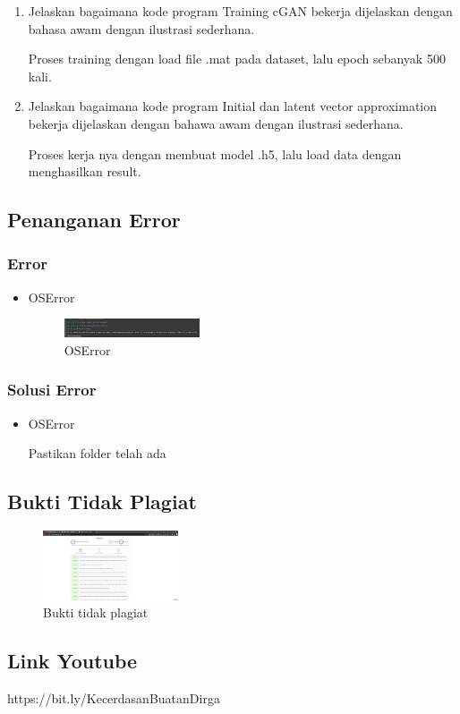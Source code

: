 \begin{enumerate}
	\item Jelaskan bagaimana kode program Training cGAN bekerja dijelaskan dengan bahasa awam dengan ilustrasi sederhana.
	\hfill\break
	
	Proses training dengan load file .mat pada dataset, lalu epoch sebanyak 500 kali.

	\item Jelaskan bagaimana kode program Initial dan latent vector approximation bekerja dijelaskan dengan bahawa awam dengan ilustrasi sederhana.
	\hfill\break
	
	Proses kerja nya dengan membuat model .h5, lalu load data dengan menghasilkan result.
	
\end{enumerate}

\subsection{Penanganan Error}
\subsubsection{Error}
\hfill\break
\begin{itemize}
\item OSError

\begin{figure}[H]
\centering
	\includegraphics[width=4cm]{figures/1174066/8/error1.jpg}
\caption{OSError}
\end{figure}
\end{itemize}
\subsubsection{Solusi Error}
\hfill\break
\begin{itemize}
\item OSError

Pastikan folder telah ada
\end{itemize}

\subsection{Bukti Tidak Plagiat}
\begin{figure}[H]
	\includegraphics[width=4cm]{figures/1174066/9/buktiplagiat.jpg}
	\centering
	\caption{Bukti tidak plagiat}
\end{figure}

\subsection{Link Youtube}
https://bit.ly/KecerdasanBuatanDirga

